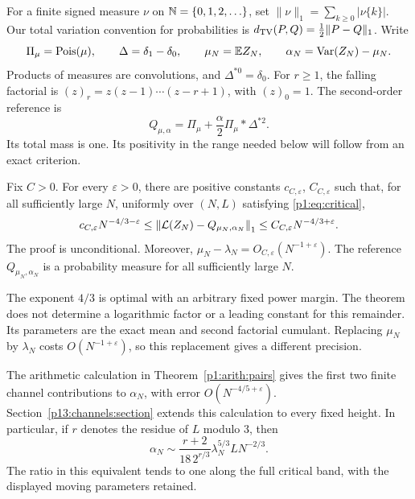 For a finite signed measure \(\nu\) on \(\mathbb N=\{0,1,2,\ldots\}\), set
\(\|\nu\|_1=\sum_{k\ge0}|\nu\{k\}|\).
Our total variation convention for probabilities is
\(d_{\mathrm{TV}}(P,Q)=\frac12\|P-Q\|_1\).
Write
\[
 \Pi_\mu=\operatorname{Pois}(\mu),\qquad
 \Delta=\delta_1-\delta_0,\qquad
 \mu_N=\mathbb E Z_N,\qquad
 \alpha_N=\operatorname{Var}(Z_N)-\mu_N .
\]
Products of measures are convolutions, and
\(\Delta^{*0}=\delta_0\). For \(r\ge1\), the falling factorial is
\((z)_r=z(z-1)\cdots(z-r+1)\), with \((z)_0=1\).
The second-order reference is
\begin{equation}
 Q_{\mu,\alpha}
    =\Pi_\mu+\frac{\alpha}{2}\Pi_\mu*\Delta^{*2}.
 \label{p1:eq:Q}
\end{equation}
Its total mass is one. Its positivity in the range needed below
will follow from an exact criterion.

\begin{theorem}
\label{p1:thm:main}
Fix \(C>0\). For every \(\varepsilon>0\), there are
positive constants \(c_{C,\varepsilon}\), \(C_{C,\varepsilon}\)
such that, for all sufficiently large \(N\), uniformly over
\((N,L)\) satisfying \eqref{p1:eq:critical},
\begin{equation}
 c_{C,\varepsilon}N^{-4/3-\varepsilon}
 \le \left\|\mathcal L(Z_N)-Q_{\mu_N,\alpha_N}\right\|_1
 \le C_{C,\varepsilon}N^{-4/3+\varepsilon}.
 \label{p1:eq:main}
\end{equation}
The proof is unconditional.
Moreover, \(\mu_N-\lambda_N=O_{C,\varepsilon}(N^{-1+\varepsilon})\).
The reference \(Q_{\mu_N,\alpha_N}\) is a probability measure for
all sufficiently large \(N\).
\end{theorem}

The exponent \(4/3\) is optimal with an arbitrary fixed power
margin. The theorem does not determine a logarithmic factor or
a leading constant for this remainder. Its parameters are the
exact mean and second factorial cumulant. Replacing \(\mu_N\)
by \(\lambda_N\) costs \(O(N^{-1+\varepsilon})\), so this
replacement gives a different precision.

The arithmetic calculation in Theorem~\ref{p1:arith:pairs} gives
the first two finite channel contributions to \(\alpha_N\),
with error \(O(N^{-4/5+\varepsilon})\).
Section~\ref{p13:channels:section} extends this calculation
to every fixed height. In particular, if \(r\) denotes the residue
of \(L\) modulo \(3\), then
\begin{equation}
 \alpha_N\sim
  \frac{r+2}{18\,2^{r/3}}\lambda_N^{5/3}L N^{-2/3}.
 \label{p1:eq:alpha-leading}
\end{equation}
The ratio in this equivalent tends to one along the full critical
band, with the displayed moving parameters retained.

